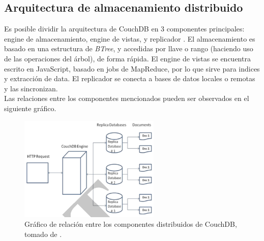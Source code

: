 \documentclass{article}
\begin{document}
\begin{itemize}
        \subsection{Arquitectura de almacenamiento distribuido}
            Es posible dividir la arquitectura de CouchDB en 3 componentes principales: engine de almacenamiento, engine de vistas, y replicador \cite{padhy}. El almacenamiento es basado en una estructura de \textit{BTree}, y accedidas por llave o rango (haciendo uso de las operaciones del árbol), de forma rápida. El engine de vistas se encuentra escrito en JavaScript, basado en jobs de MapReduce, por lo que sirve para indices y extracción de data. El replicador se conecta a bases de datos locales o remotas y las sincronizan. \\
            Las relaciones entre los componentes mencionados pueden ser observados en el siguiente gráfico. \\
            \begin{figure}[h]
                \caption{Gráfico de relación entre los componentes distribuidos de CouchDB, tomado de \cite{padhy}.}
                \includegraphics[width = 0.6\textwidth]{architecture.png}
            \end{figure}

\end{itemize}
\end{document}
